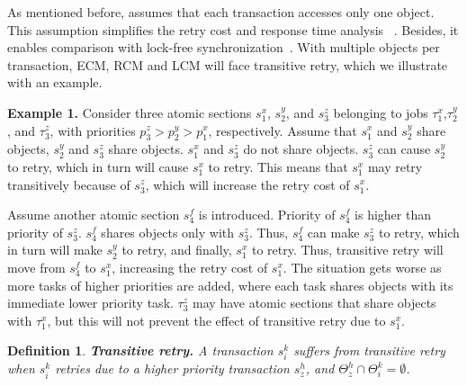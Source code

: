 \documentclass[twocolumn]{article}
\newtheorem{mydef}{Definition}
\begin{document}
As mentioned before, \cite{stmconcurrencycontrol:emsoft11,lcmdac2012} assumes that each transaction accesses only one object. This assumption simplifies the retry cost 
and response time analysis
~\cite{stmconcurrencycontrol:emsoft11,lcmdac2012}. Besides, it enables comparison with lock-free synchronization~\cite{key-5}. With multiple objects per transaction, ECM, RCM and LCM will face transitive retry, which we illustrate with an example.

\textbf{Example 1.} Consider three atomic sections $s_{1}^{x}$, $s_{2}^{y}$, 
and $s_{3}^{z}$ belonging to jobs $\tau_{1}^{x}$,$\tau_{2}^{y}$, 
and $\tau_{3}^{z}$, with priorities $p_{3}^{z}>p_{2}^{y}>p_{1}^{x}$, respectively. 
Assume that $s_{1}^{x}$ and $s_{2}^{y}$ share objects, $s_{2}^{y}$ and $s_{3}^{z}$
share objects. $s_{1}^{x}$ and $s_{3}^{z}$ do not share objects.
$s_{3}^{z}$ can cause $s_{2}^{y}$ to retry, which in turn will cause $s_{1}^{x}$ to retry. 
This means that $s_{1}^{x}$ may retry transitively
because of $s_{3}^{z}$, which will increase the retry cost of $s_{1}^{x}$.

Assume another atomic section $s_4^f$ is introduced. Priority of $s_4^f$ is higher than priority of $s_3^z$. $s_4^f$ shares objects only with $s_3^z$. Thus, $s_4^f$ can make $s_3^z$ to retry, which in turn will make $s_2^y$ to retry, and finally, $s_1^x$ to retry. Thus, transitive retry will move from $s_{4}^{f}$ to $s_{1}^{x}$, increasing the retry cost of $s_{1}^{x}$. 
The situation gets worse as more tasks of higher priorities are added, where each task
shares objects with its immediate lower priority task. $\tau_{3}^{z}$
may have atomic sections that share objects with $\tau_{1}^{x}$,
but this will not prevent the effect of transitive retry due to $s_{1}^{x}$.

\begin{mydef}
\label{defn:trans-retry}
\textbf{Transitive retry.} A transaction $s_{i}^{k}$ suffers from
transitive retry when $s_i^k$ retries due to a higher priority transaction $s_z^h$, and $\Theta_z^h \cap \Theta_i^k=\emptyset$.
\end{mydef}
\end{document}
